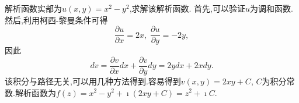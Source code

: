 \begin{examplebox}{解析函数实部为$u(x,y) = x^2 - y^2$,求解该解析函数.}
首先,可以验证$u$为调和函数.然后,利用柯西-黎曼条件可得
\begin{equation}
    \frac{\partial u}{\partial x } = 2x, \; \frac{\partial u}{\partial y } = -2y  ,
\end{equation}
因此
\begin{equation}
    d v = \frac{\partial v}{\partial x } dx + \frac{\partial v}{\partial y } dy = 2y dx + 2x dy .
\end{equation}
该积分与路径无关,可以用几种方法得到.容易得到$v(x,y) = 2xy + C$, $C$为积分常数.解析函数为$f(z)=x^2 - y^2 + \imath (2x y + C) = z^2 + \imath C$.
\end{examplebox}
    